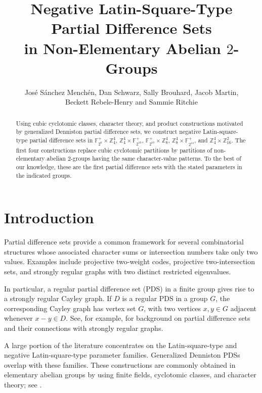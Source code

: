 \documentclass[11pt]{article}
\title{
    \textbf{
    Negative Latin-Square-Type Partial Difference Sets\\
    in Non-Elementary Abelian \(2\)-Groups
    }
}
\author{
Jos\'e S\'anchez Mench\'en, 
Dan Schwarz, Sally Brouhard,
Jacob Martin,\\
Beckett Rebele-Henry and 
Sammie Ritchie
}
\date{}
\theoremstyle{definition}
\theoremstyle{remark}
\newcommand{\F}{\mathbb{F}}
\newcommand{\Z}{\mathbb{Z}}
\begin{document}
\maketitle

\begin{abstract}
Using cubic cyclotomic classes, character theory, and product
constructions motivated by generalized Denniston partial difference
sets, we construct negative Latin-square-type partial difference sets
in $\F_{2^6}^{+}\times\Z_4^4$, $\Z_4^4\times\F_{2^{10}}^{+}$, $\F_{2^{10}}^{+}\times\Z_8^4$, $\Z_8^4\times\F_{2^{14}}^{+}$,
and $\Z_4^4\times\Z_{16}^2$. The first four constructions replace cubic cyclotomic partitions by
partitions of non-elementary abelian \(2\)-groups having the same
character-value patterns. To the best of our knowledge, these are the
first partial difference sets with the stated parameters in the
indicated groups.

\end{abstract}

\medskip



\section{Introduction}

Partial difference sets provide a common framework for several
combinatorial structures whose associated character sums or
intersection numbers take only two values. Examples include
projective two-weight codes, projective two-intersection sets, and
strongly regular graphs with two distinct restricted eigenvalues.

In particular, a regular partial difference set (PDS) in a finite group gives rise to a strongly regular Cayley graph. If \(D\) is a regular
PDS in a group \(G\), the corresponding Cayley
graph has vertex set \(G\), with two vertices \(x,y\in G\) adjacent
whenever $x-y\in D.$
See, for example, \cite{MaSurvey} for background on partial difference
sets and their connections with strongly regular graphs.

A large portion of the literature concentrates on the Latin-square-type
and negative Latin-square-type parameter families. Generalized
Denniston PDSs overlap with these families. These constructions are commonly obtained in elementary
abelian groups by using finite fields, cyclotomic classes, and
character theory; see \cite{denniston1969,GenDennPaper}.
\end{document}
